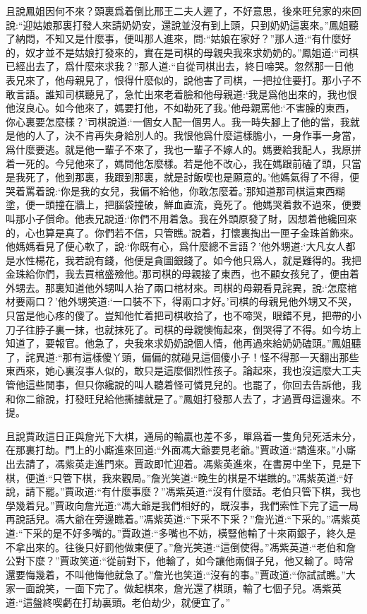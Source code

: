 \begin{parag}
    且說鳳姐因何不來？頭裏爲着倒比邢王二夫人遲了，不好意思，後來旺兒家的來回說:“迎姑娘那裏打發人來請奶奶安，還說並沒有到上頭，只到奶奶這裏來。”鳳姐聽了納悶，不知又是什麼事，便叫那人進來，問:“姑娘在家好？”那人道:“有什麼好的，奴才並不是姑娘打發來的，實在是司棋的母親央我來求奶奶的。”鳳姐道:“司棋已經出去了，爲什麼來求我？”那人道:“自從司棋出去，終日啼哭。忽然那一日他表兄來了，他母親見了，恨得什麼似的，說他害了司棋，一把拉住要打。那小子不敢言語。誰知司棋聽見了，急忙出來老着臉和他母親道:‘我是爲他出來的，我也恨他沒良心。如今他來了，媽要打他，不如勒死了我。’他母親罵他:‘不害臊的東西，你心裏要怎麼樣？’司棋說道:‘一個女人配一個男人。我一時失腳上了他的當，我就是他的人了，決不肯再失身給別人的。我恨他爲什麼這樣膽小，一身作事一身當，爲什麼要逃。就是他一輩子不來了，我也一輩子不嫁人的。媽要給我配人，我原拼着一死的。今兒他來了，媽問他怎麼樣。若是他不改心，我在媽跟前磕了頭，只當是我死了，他到那裏，我跟到那裏，就是討飯喫也是願意的。’他媽氣得了不得，便哭着罵着說:‘你是我的女兒，我偏不給他，你敢怎麼着。’那知道那司棋這東西糊塗，便一頭撞在牆上，把腦袋撞破，鮮血直流，竟死了。他媽哭着救不過來，便要叫那小子償命。他表兄說道:‘你們不用着急。我在外頭原發了財，因想着他纔回來的，心也算是真了。你們若不信，只管瞧。’說着，打懷裏掏出一匣子金珠首飾來。他媽媽看見了便心軟了，說:‘你既有心，爲什麼總不言語？’他外甥道:‘大凡女人都是水性楊花，我若說有錢，他便是貪圖銀錢了。如今他只爲人，就是難得的。我把金珠給你們，我去買棺盛殮他。’那司棋的母親接了東西，也不顧女孩兒了，便由着外甥去。那裏知道他外甥叫人抬了兩口棺材來。司棋的母親看見詫異，說:‘怎麼棺材要兩口？’他外甥笑道:‘一口裝不下，得兩口才好。’司棋的母親見他外甥又不哭，只當是他心疼的傻了。豈知他忙着把司棋收拾了，也不啼哭，眼錯不見，把帶的小刀子往脖子裏一抹，也就抹死了。司棋的母親懊悔起來，倒哭得了不得。如今坊上知道了，要報官。他急了，央我來求奶奶說個人情，他再過來給奶奶磕頭。”鳳姐聽了，詫異道:“那有這樣傻丫頭，偏偏的就碰見這個傻小子！怪不得那一天翻出那些東西來，她心裏沒事人似的，敢只是這麼個烈性孩子。論起來，我也沒這麼大工夫管他這些閒事，但只你纔說的叫人聽着怪可憐見兒的。也罷了，你回去告訴他，我和你二爺說，打發旺兒給他撕擄就是了。”鳳姐打發那人去了，才過賈母這邊來。不提。
\end{parag}


\begin{parag}
    且說賈政這日正與詹光下大棋，通局的輸贏也差不多，單爲着一隻角兒死活未分，在那裏打劫。門上的小廝進來回道:“外面馮大爺要見老爺。”賈政道:“請進來。”小廝出去請了，馮紫英走進門來。賈政即忙迎着。馮紫英進來，在書房中坐下，見是下棋，便道:“只管下棋，我來觀局。”詹光笑道:“晚生的棋是不堪瞧的。”馮紫英道:“好說，請下罷。”賈政道:“有什麼事麼？”馮紫英道:“沒有什麼話。老伯只管下棋，我也學幾着兒。”賈政向詹光道:“馮大爺是我們相好的，既沒事，我們索性下完了這一局再說話兒。馮大爺在旁邊瞧着。”馮紫英道:“下采不下采？”詹光道:“下采的。”馮紫英道:“下采的是不好多嘴的。”賈政道:“多嘴也不妨，橫豎他輸了十來兩銀子，終久是不拿出來的。往後只好罰他做東便了。”詹光笑道:“這倒使得。”馮紫英道:“老伯和詹公對下麼？”賈政笑道:“從前對下，他輸了，如今讓他兩個子兒，他又輸了。時常還要悔幾着，不叫他悔他就急了。”詹光也笑道:“沒有的事。”賈政道:“你試試瞧。”大家一面說笑，一面下完了。做起棋來，詹光還了棋頭，輸了七個子兒。馮紫英道:“這盤終喫虧在打劫裏頭。老伯劫少，就便宜了。”
\end{parag}


